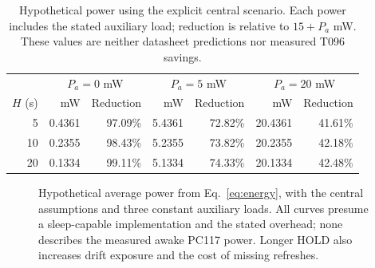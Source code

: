 \documentclass[11pt,letterpaper]{article}
\begin{document}
\begin{table}[t]\centering\small
\caption{Hypothetical power using the explicit central scenario. Each power includes the stated auxiliary load; reduction is relative to $15+P_a$ mW. These values are neither datasheet predictions nor measured T096 savings.}\label{tab:power}
\begin{tabular}{rrrrrrr}\toprule
 & \multicolumn{2}{c}{$P_a=0$ mW} & \multicolumn{2}{c}{$P_a=5$ mW} & \multicolumn{2}{c}{$P_a=20$ mW}\\
$H$ (s) & mW & Reduction & mW & Reduction & mW & Reduction\\\midrule
5 & 0.4361 & 97.09\% & 5.4361 & 72.82\% & 20.4361 & 41.61\%\\
10 & 0.2355 & 98.43\% & 5.2355 & 73.82\% & 20.2355 & 42.18\%\\
20 & 0.1334 & 99.11\% & 5.1334 & 74.33\% & 20.1334 & 42.48\%\\\bottomrule
\end{tabular}
\end{table}

\begin{figure}[t]\centering
\caption{Hypothetical average power from Eq.~\ref{eq:energy}, with the central assumptions and three constant auxiliary loads. All curves presume a sleep-capable implementation and the stated overhead; none describes the measured awake PC117 power. Longer HOLD also increases drift exposure and the cost of missing refreshes.}\label{fig:power}
\end{figure}
\end{document}
